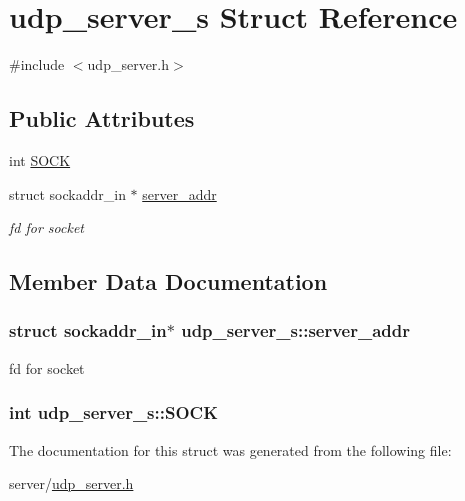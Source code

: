 \hypertarget{structudp__server__s}{\section{udp\-\_\-server\-\_\-s Struct Reference}
\label{structudp__server__s}
}


{\ttfamily \#include $<$udp\-\_\-server.\-h$>$}

\subsection*{Public Attributes}
\begin{DoxyCompactItemize}
\item 
int \hyperlink{structudp__server__s_ab69c6ca2a884b93b89caf16f00a99ad5}{S\-O\-C\-K}
\item 
struct sockaddr\-\_\-in $\ast$ \hyperlink{structudp__server__s_afd340e181c49c891fde2450fcef27450}{server\-\_\-addr}
\begin{DoxyCompactList}\small\item\em fd for socket \end{DoxyCompactList}\end{DoxyCompactItemize}


\subsection{Member Data Documentation}
\hypertarget{structudp__server__s_afd340e181c49c891fde2450fcef27450}{
\subsubsection[{server\-\_\-addr}]{\setlength{\rightskip}{0pt plus 5cm}struct sockaddr\-\_\-in$\ast$ udp\-\_\-server\-\_\-s\-::server\-\_\-addr}}\label{structudp__server__s_afd340e181c49c891fde2450fcef27450}


fd for socket 

\hypertarget{structudp__server__s_ab69c6ca2a884b93b89caf16f00a99ad5}{
\subsubsection[{S\-O\-C\-K}]{\setlength{\rightskip}{0pt plus 5cm}int udp\-\_\-server\-\_\-s\-::\-S\-O\-C\-K}}\label{structudp__server__s_ab69c6ca2a884b93b89caf16f00a99ad5}


The documentation for this struct was generated from the following file\-:\begin{DoxyCompactItemize}
\item 
server/\hyperlink{udp__server_8h}{udp\-\_\-server.\-h}\end{DoxyCompactItemize}
